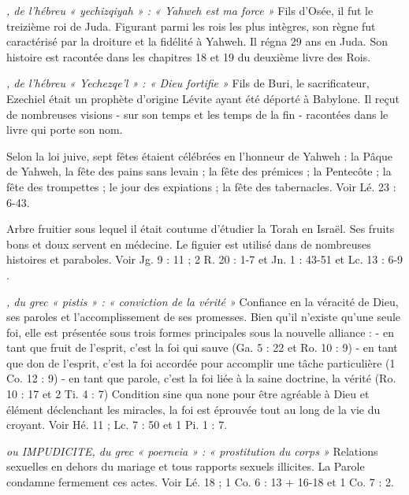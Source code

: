 \begin{multicols}{2}
\textit{, de l'hébreu « yechizqiyah » : « Yahweh est ma force »}\newline
Fils d'Osée, il fut le treizième roi de Juda. Figurant parmi les rois les plus intègres, son règne fut caractérisé par la droiture et la fidélité à Yahweh. Il régna 29 ans en Juda. Son histoire est racontée dans les chapitres 18 et 19 du deuxième livre des Rois.

\textit{, de l'hébreu « Yechezqe'l » : « Dieu fortifie »}\newline
Fils de Buri, le sacrificateur, Ezechiel était un prophète d’origine Lévite ayant été déporté à Babylone. Il reçut de nombreuses visions - sur son temps et les temps de la fin - racontées dans le livre qui porte son nom.

\textit{}\newline
Selon la loi juive, sept fêtes étaient célébrées en l’honneur de Yahweh : la Pâque de Yahweh, la fête des pains sans levain ; la fête des prémices ; la Pentecôte ; la fête des trompettes ; le jour des expiations ; la fête des tabernacles. Voir Lé. 23 : 6-43.

\textit{}\newline
Arbre fruitier sous lequel il était coutume d’étudier la Torah en Israël. Ses fruits bons et doux servent en médecine. Le figuier est utilisé dans de nombreuses histoires et paraboles. Voir Jg. 9 : 11 ; 2 R. 20 : 1-7 et Jn. 1 : 43-51 et Lc. 13 : 6-9 .

\textit{, du grec « pistis » : « conviction de la vérité »}\newline
Confiance en la véracité de Dieu, ses paroles et l’accomplissement de ses promesses. Bien qu’il n’existe qu’une seule foi, elle est présentée sous trois formes principales sous la nouvelle alliance :
- en tant que fruit de l’esprit, c’est la foi qui sauve (Ga. 5 : 22 et Ro. 10 : 9)
- en tant que don de l’esprit, c’est la foi accordée pour accomplir une tâche particulière (1 Co. 12 : 9)
- en tant que parole, c’est la foi liée à la saine doctrine, la vérité (Ro. 10 : 17 et 2 Ti. 4 : 7)
Condition sine qua none pour être agréable à Dieu et élément déclenchant les miracles, la foi est éprouvée tout au long de la vie du croyant. Voir Hé. 11 ; Lc. 7 : 50 et 1 Pi. 1 : 7.

\textit{ou IMPUDICITE, du grec « poerneia » : « prostitution du corps »}\newline
Relations sexuelles en dehors du mariage et tous rapports sexuels illicites. La Parole condamne fermement ces actes. Voir Lé. 18 ; 1 Co. 6 : 13 + 16-18 et 1 Co. 7 : 2.


\end{multicols}
